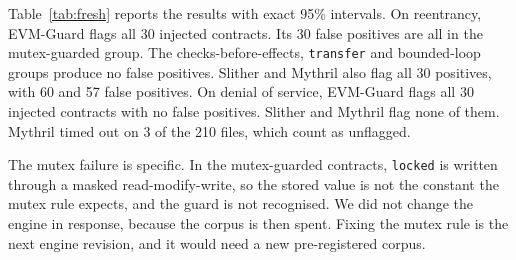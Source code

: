 \documentclass[pdflatex,sn-mathphys]{sn-jnl}
\theoremstyle{thmstyleone}
\theoremstyle{thmstyletwo}
\begin{document}
Table~\ref{tab:fresh} reports the results with exact 95\% intervals. On reentrancy, EVM-Guard flags all 30 injected contracts. Its 30 false positives are all in the mutex-guarded group. The checks-before-effects, \texttt{transfer} and bounded-loop groups produce no false positives. Slither and Mythril also flag all 30 positives, with 60 and 57 false positives. On denial of service, EVM-Guard flags all 30 injected contracts with no false positives. Slither and Mythril flag none of them. Mythril timed out on 3 of the 210 files, which count as unflagged.

\begin{table}[t]
\centering
\small
\caption{Fresh pre-registered test (210 Solidity 0.5.12 contracts, synthetic). Recall, precision and FPR with exact 95\% Clopper--Pearson intervals. The categories are scored on their own positives and negatives.}
\label{tab:fresh}
\end{table}

The mutex failure is specific. In the mutex-guarded contracts, \texttt{locked} is written through a masked read-modify-write, so the stored value is not the constant the mutex rule expects, and the guard is not recognised. We did not change the engine in response, because the corpus is then spent. Fixing the mutex rule is the next engine revision, and it would need a new pre-registered corpus.
\end{document}

